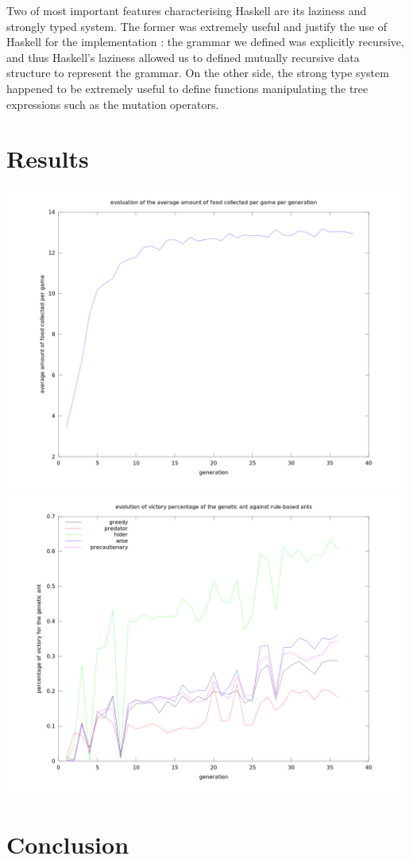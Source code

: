 \documentclass[10pt,a4paper]{article}
\begin{document}
Two of most important features characterising Haskell are its laziness
and strongly typed system. The former was extremely useful and justify
the use of Haskell for the implementation : the grammar we defined was
explicitly recursive, and thus Haskell's laziness allowed us to
defined mutually recursive data structure to represent the grammar. On
the other side, the strong type system happened to be extremely useful
to define functions manipulating the tree expressions such as the
mutation operators.

\section{Results}

\includegraphics[scale=0.3]{../experiment/standard_island4_food_stat.png}
\includegraphics[scale=0.3]{../experiment/standardBestAnt.png}



\section*{Conclusion}
\end{document}
